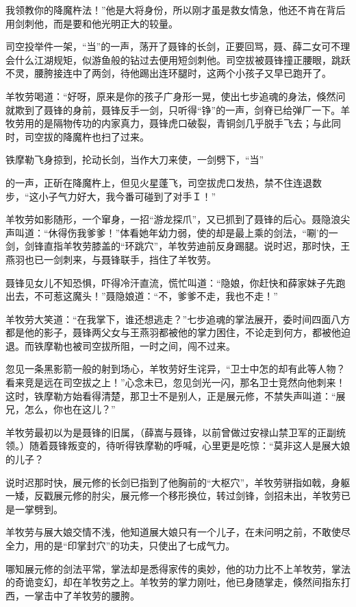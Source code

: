 \documentclass[12pt,oneside]{book}
\begin{document}
我领教你的降魔杵法！''他是大将身份，所以刚才虽是救女情急，他还不肯在背后用剑刺他，而是要和他光明正大的较量。

司空投举件一架，``当''的一声，荡开了聂锋的长剑，正要回骂，聂、薛二女可不理会什么江湖规矩，似游鱼般的钻过去便用短剑刺他。司空拔被聂锋撞正腰眼，跳跃不灵，腰胯接连中了两剑，待他踢出连环腿时，这两个小孩子又早已跑开了。

羊牧劳喝道：``好呀，原来是你的孩子广身形一晃，使出七步追魂的身法，倏然问就欺到了聂锋的身前，聂锋反手一剑，只听得``铮''的一声，剑脊已给弹厂一下。羊牧劳用的是隔物传功的内家真力，聂锋虎口破裂，青铜剑几乎脱手飞去；与此同时，司空拔的降魔杵也扫了过来。

铁摩勒飞身掠到，抡动长剑，当作大刀来使，一剑劈下，``当''

的一声，正斫在降魔杵上，但见火星蓬飞，司空拔虎口发热，禁不住连退数步，``这小子气力好大，我今番可碰到了对手Ｉ！''

羊牧劳如影随形，一个窜身，一招``游龙探爪''，又已抓到了聂锋的后心。聂隐浪尖声叫道：``休得伤我爹爹！''体看她年幼力弱，使的却是最上乘的剑法，``唰'的一剑，剑锋直指羊牧劳膝盖的``环跳穴''，羊牧劳迪前反身踢腿。说时迟，那时快，王燕羽也已一剑刺来，与聂锋联手，挡住了羊牧劳。

聂锋见女儿不知恐惧，吓得冷汗直流，慌忙叫道：``隐娘，你赶快和薛家妹子先跑出去，不可惹这魔头！''聂隐娘道：``不，爹爹不走，我也不走！''

羊牧劳大笑道：``在我掌下，谁还想逃走？''七步追魂的掌法展开，委时间四面八方都是他的影子，聂锋两父女与王燕羽都被他的掌力困住，不论走到何方，都被他迫退。而铁摩勒也被司空拔所阻，一时之间，闯不过来。

忽见一条黑影箭一般的射到场心，羊牧劳好生诧异，``卫士中怎的却有此等人物？看来竞是远在司空拔之上！''心念未已，忽见剑光一闪，那名卫士竞然向他刺来！这时，铁摩勒方始看得清楚，那卫士不是别人，正是展元修，不禁失声叫道：``展兄，怎么，你也在这儿？''

羊牧劳最初以为是聂锋的旧属，（薛嵩与聂锋，以前曾做过安禄山禁卫军的正副统领。）随着聂锋叛变的，待听得铁摩勒的呼喊，心里更是吃惊：``莫非这人是展大娘的儿子？

说时迟那时快，展元修的长剑已指到了他胸前的``大枢穴''，羊牧劳骈指如戟，身躯一矮，反戳展元修的肘尖，展元修一个移形换位，转过剑锋，剑招未出，羊牧劳已是一掌劈到。

羊牧劳与展大娘交情不浅，他知道展大娘只有一个儿子，在未问明之前，不敢使尽全力，用的是``印掌封穴''的功夫，只使出了七成气力。

哪知展元修的剑法平常，掌法却是悉得家传的奥妙，他的功力比不上羊牧劳，掌法的奇诡变幻，却在羊牧劳之上。羊牧劳的掌力刚吐，他已身随掌走，倏然间指东打西，一掌击中了羊牧劳的腰胯。
\end{document}

